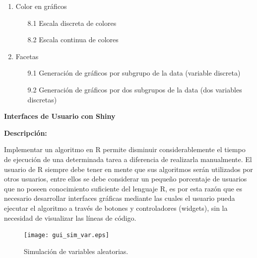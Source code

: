 \documentclass[12pt,a4paper,oneside]{article}\usepackage[]{graphicx}\usepackage[]{color}
\begin{document}
\begin{enumerate}
\begin{enumerate}
      \item[7.1] Modificación de escala, color, letra, etc. de ejes
      \item[7.2] Modificación de posisión, color, letra, etc. de legendas
      \item[7.3] Modificación de margenes, color de fondo
   \end{enumerate}
   \item{Color en gráficos}
   \begin{enumerate}
      \item[8.1] Escala discreta de colores
      \item[8.2] Escala continua de colores
   \end{enumerate}
   \item{Facetas}
   \begin{enumerate}
      \item[9.1] Generación de gráficos por subgrupo de la data (variable discreta)
      \item[9.2] Generación de gráficos por dos subgrupos de la data (dos variables discretas)
   \end{enumerate}
\end{enumerate}



\newpage

\begin{center}
{\bf \Large Interfaces de Usuario con Shiny}
\end{center}

{\bf \large Descripción:}\newline

Implementar un algoritmo en R permite disminuir considerablemente el tiempo de ejecución de una determinada tarea a diferencia de realizarla manualmente. El usuario de R siempre debe tener en mente que sus algoritmos serán utilizados por otros usuarios, entre ellos se debe considerar un pequeño porcentaje de usuarios que no poseen conocimiento suficiente del lenguaje R, es por esta razón que es necesario desarrollar interfaces gráficas mediante las cuales el usuario pueda ejecutar el algoritmo a través de botones y controladores (widgets), sin la necesidad de visualizar las líneas de código.\newline

\begin{figure}[H]
\begin{center}
     \texttt{[image: gui\_sim\_var.eps]}
  \caption{Simulación de variables aleatorias.}
  \label{simvar}
\end{center}
\end{figure}
\end{document}
